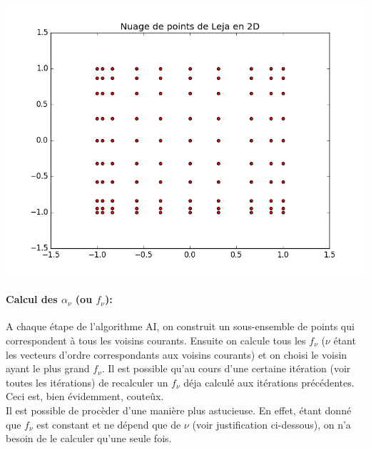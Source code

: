 \begin{center}
\includegraphics[height= 9 cm,width = \linewidth]{images/leja_sequence.png}
\end{center}

\paragraph{Calcul des $\alpha_{\nu}$ (ou $f_{\nu}$):}
A chaque étape de l'algorithme AI, on construit un sous-ensemble de points qui correspondent à tous les voisins courants.
Ensuite on calcule tous les $f_{\nu}$ ($\nu$ étant les vecteurs d'ordre correspondants aux voisins courants)
et on choisi le voisin ayant le plus grand $f_{\nu}$. Il est possible qu'au cours d'une certaine itération (voir toutes les itérations)
de recalculer un $f_{\nu}$ déja calculé aux itérations précédentes. Ceci est, bien évidemment, couteûx. \\
Il est possible de procèder d'une manière plus astucieuse. En effet, étant donné que $f_{\nu}$ est constant et ne dépend que de $\nu$ (voir justification ci-dessous),
on n'a besoin de le calculer qu'une seule fois.

